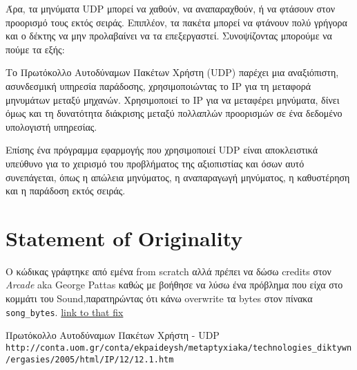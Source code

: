 \documentclass{article}
\begin{document}
Άρα, τα μηνύματα UDP μπορεί να χαθούν, να αναπαραχθούν, ή να φτάσουν στον
προορισμό τους εκτός σειράς. Επιπλέον, τα πακέτα μπορεί να φτάνουν πολύ γρήγορα
και ο δέκτης να μην προλαβαίνει να τα επεξεργαστεί. Συνοψίζοντας μπορούμε να
πούμε τα εξής:

Το Πρωτόκολλο Αυτοδύναμων Πακέτων Χρήστη (UDP) παρέχει μια αναξιόπιστη,
ασυνδεσμική υπηρεσία παράδοσης, χρησιμοποιώντας το ΙΡ για τη μεταφορά μηνυμάτων
μεταξύ μηχανών. Χρησιμοποιεί το ΙΡ για να μεταφέρει μηνύματα, δίνει όμως και τη
δυνατότητα διάκρισης μεταξύ πολλαπλών προορισμών σε ένα δεδομένο υπολογιστή
υπηρεσίας.

Επίσης ένα πρόγραμμα εφαρμογής που χρησιμοποιεί UDP είναι αποκλειστικά υπεύθυνο
για το χειρισμό του προβλήματος της αξιοπιστίας και όσων αυτό συνεπάγεται, όπως
η απώλεια μηνύματος, η αναπαραγωγή μηνύματος, η καθυστέρηση και η παράδοση εκτός
σειράς.

\section{Statement of Originality}

Ο κώδικας γράφτηκε από εμένα from scratch αλλά πρέπει να δώσω credits στον
\emph{Arcade} aka George Pattas καθώς με βοήθησε να λύσω ένα πρόβλημα που είχα στο κομμάτι του
Sound,παρατηρώντας ότι κάνω overwrite τα bytes στον πίνακα \verb|song_bytes|.
\href{https://github.com/johnstef99/networks_2/commit/bc42b8c7da607addea5c8f30b90cf869de907ab0}{link to that fix}


\begin{thebibliography}{9}

Πρωτόκολλο Αυτοδύναμων Πακέτων Χρήστη - UDP
\\\texttt{http://conta.uom.gr/conta/ekpaideysh/metaptyxiaka/technologies\_diktywn
/ergasies/2005/html/IP/12/12.1.htm}
\end{thebibliography}
\end{document}
